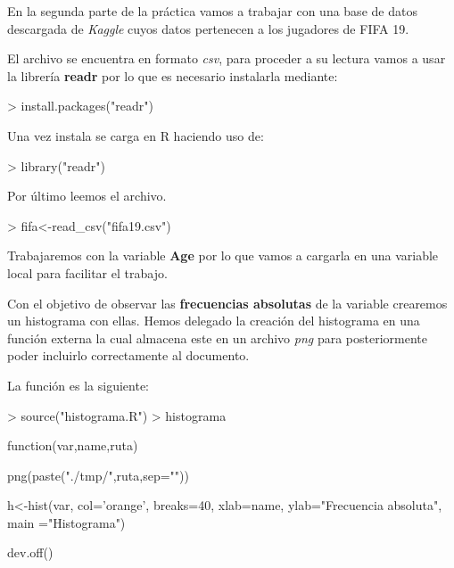 \documentclass [a4paper] {article}
\begin{document}
\newpage
En la segunda parte de la pr\'actica vamos a trabajar con una base de datos descargada de
\textit{Kaggle} cuyos datos pertenecen a los jugadores de FIFA 19.

\bigskip
El archivo se encuentra en formato \textit{csv}, para proceder a su lectura vamos a usar la 
librer\'ia \textbf{readr} por lo que es necesario instalarla mediante:
\begin{Schunk}
\begin{Sinput}
> install.packages("readr")
\end{Sinput}
\end{Schunk}

\bigskip
Una vez instala se carga en R haciendo uso de:
\begin{Schunk}
\begin{Sinput}
> library("readr")
\end{Sinput}
\end{Schunk}

\bigskip
Por \'ultimo leemos el archivo.
\begin{Schunk}
\begin{Sinput}
> fifa<-read_csv("fifa19.csv")
\end{Sinput}
\end{Schunk}

\bigskip
Trabajaremos con la variable \textbf{Age} por lo que vamos a cargarla en una variable
local para facilitar el trabajo.
\begin{Schunk}
\end{Schunk}

\bigskip
Con el objetivo de observar las \textbf{frecuencias absolutas} de la variable crearemos un histograma con ellas. Hemos delegado
la creaci\'on del histograma en una funci\'on externa la cual almacena este en un archivo \textit{png} para posteriormente poder incluirlo
correctamente al documento.

La funci\'on es la siguiente:
\begin{Schunk}
\begin{Sinput}
> source("histograma.R")
> histograma
\end{Sinput}
\begin{Soutput}
function(var,name,ruta) {
    png(paste("./tmp/",ruta,sep=""))
 
    h<-hist(var, col='orange', breaks=40, xlab=name, 
            ylab="Frecuencia absoluta", main ="Histograma") 

    dev.off()
}
\end{Soutput}
\end{Schunk}
\end{document}
